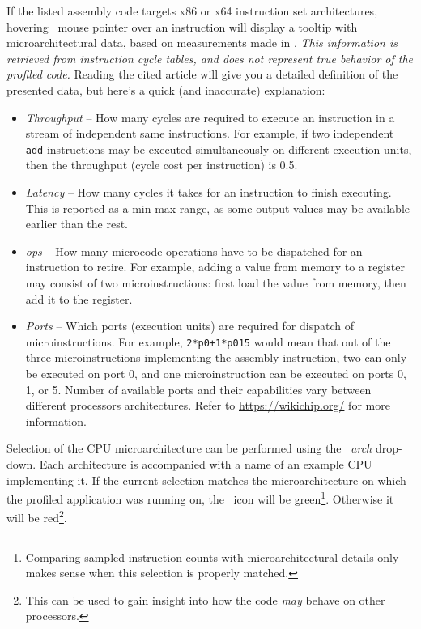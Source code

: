 \documentclass[hidelinks,titlepage,a4paper]{article}
\begin{document}
If the listed assembly code targets x86 or x64 instruction set architectures, hovering \faMousePointer{}~mouse pointer over an instruction will display a tooltip with microarchitectural data, based on measurements made in \cite{Abel19a}. \emph{This information is retrieved from instruction cycle tables, and does not represent true behavior of the profiled code.} Reading the cited article will give you a detailed definition of the presented data, but here's a quick (and inaccurate) explanation:

\begin{itemize}
\item \emph{Throughput} -- How many cycles are required to execute an instruction in a stream of independent same instructions. For example, if two independent \texttt{add} instructions may be executed simultaneously on different execution units, then the throughput (cycle cost per instruction) is 0.5.
\item \emph{Latency} -- How many cycles it takes for an instruction to finish executing. This is reported as a min-max range, as some output values may be available earlier than the rest.
\item \emph{\textmu{}ops} -- How many microcode operations have to be dispatched for an instruction to retire. For example, adding a value from memory to a register may consist of two microinstructions: first load the value from memory, then add it to the register.
\item \emph{Ports} -- Which ports (execution units) are required for dispatch of microinstructions. For example, \texttt{2*p0+1*p015} would mean that out of the three microinstructions implementing the assembly instruction, two can only be executed on port 0, and one microinstruction can be executed on ports 0, 1, or 5. Number of available ports and their capabilities vary between different processors architectures. Refer to \url{https://wikichip.org/} for more information.
\end{itemize}

Selection of the CPU microarchitecture can be performed using the \emph{\faMicrochip{}~\textmu{}arch} drop-down. Each architecture is accompanied with a name of an example CPU implementing it. If the current selection matches the microarchitecture on which the profiled application was running on, the \faMicrochip{}~icon will be green\footnote{Comparing sampled instruction counts with microarchitectural details only makes sense when this selection is properly matched.}. Otherwise it will be red\footnote{This can be used to gain insight into how the code \emph{may} behave on other processors.}.
\end{document}
